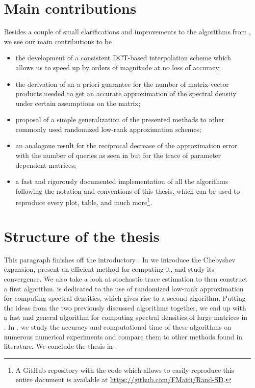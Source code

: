 \section{Main contributions}
\label{sec:1-introduction-contributions}

Besides a couple of small clarifications and improvements to the algorithms 
from \cite{lin2017randomized}, we see our main contributions to be

\begin{itemize}
    \item the development of a consistent \gls{DCT}-based interpolation scheme which allows us
          to speed up \cite[algorithm~5]{lin2017randomized} by orders of magnitude
          at no loss of accuracy;
    \item the derivation of an a priori guarantee for the number of matrix-vector
          products needed to get an accurate approximation of the spectral
          density under certain assumptions on the matrix;
    \item proposal of a simple generalization of the presented methods to other
          commonly used randomized low-rank approximation schemes;
    \item an analogoue result for the reciprocal decrease of the approximation
          error with the number of queries as seen in \cite[theorem~1]{meyer2021hutch}
          but for the trace of parameter dependent matrices;
    \item a fast and rigorously documented implementation of all the algorithms
          following the notation and conventions of this thesis, which can be used to
          reproduce every plot, table, and much more\footnote{A GitHub repository
          with the code which allows to easily reproduce this entire document
          is available at \url{https://github.com/FMatti/Rand-SD}.}.
\end{itemize}


\section{Structure of the thesis}
\label{sec:1-introduction-structure}

This paragraph finishes off the introductory .
In  we introduce the Chebyshev expansion, present an
efficient method for computing it, and study its convergence. We also take a
look at stochastic trace estimation to then construct a first algorithm.
 is dedicated to the use of randomized low-rank approximation
for computing spectral densities, which gives rise to a second algorithm.
Putting the ideas from the two previously discussed algorithms together,
we end up with a fast and general algorithm for computing spectral densities
of large matrices in . In ,
we study the accuracy and computational time of these algorithms on numerous
numerical experiments and compare them to other methods found in literature.
We conclude the thesis in .
